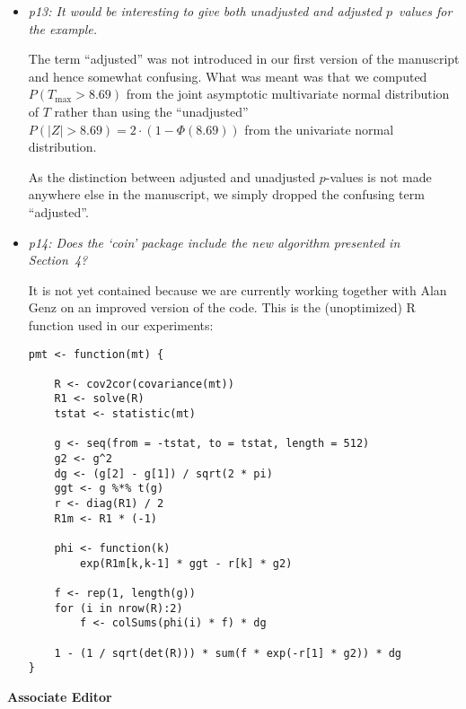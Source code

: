 \documentclass[11pt,a4paper]{article}
\begin{document}
\begin{itemize}
	 	
  \item \textit{p13: It would be interesting to give both unadjusted and adjusted $p$~values
        for the example.}
	
	The term ``adjusted'' was not introduced in our first version of
	the manuscript and hence somewhat confusing. What was meant was that
	we computed $P(T_{\max} > 8.69)$ from the joint asymptotic multivariate normal	
	distribution of $T$ rather than using the ``unadjusted''
	$P(|Z| > 8.69) = 2 \cdot (1 - \Phi(8.69))$ from the univariate normal
	distribution.
	
	As the distinction between adjusted and unadjusted $p$-values is not
	made anywhere else in the manuscript, we simply dropped the confusing term ``adjusted''.
	
  \item \textit{p14: Does the `coin' package include the new algorithm presented in
        Section~4?}
	
	It is not yet contained because we are currently working together with Alan Genz
	on an improved version of the code. This is the (unoptimized) \textsf{R} function
        used in our experiments:

\begin{verbatim}
pmt <- function(mt) {

    R <- cov2cor(covariance(mt))
    R1 <- solve(R)
    tstat <- statistic(mt)

    g <- seq(from = -tstat, to = tstat, length = 512)
    g2 <- g^2
    dg <- (g[2] - g[1]) / sqrt(2 * pi)
    ggt <- g %*% t(g)
    r <- diag(R1) / 2
    R1m <- R1 * (-1)

    phi <- function(k)
        exp(R1m[k,k-1] * ggt - r[k] * g2)

    f <- rep(1, length(g))
    for (i in nrow(R):2)
        f <- colSums(phi(i) * f) * dg

    1 - (1 / sqrt(det(R))) * sum(f * exp(-r[1] * g2)) * dg
}
\end{verbatim}    


\end{itemize}


\textbf{\large Associate Editor}
\end{document}
